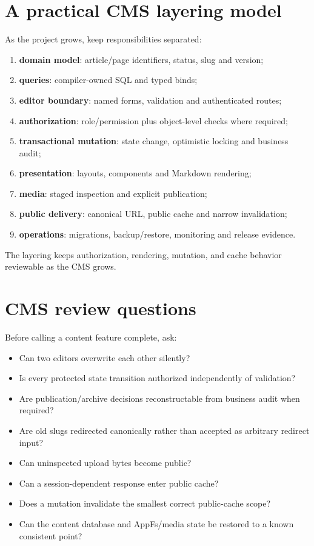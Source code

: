 \section{A practical CMS layering model}

As the project grows, keep responsibilities separated:

\begin{enumerate}
  \item \textbf{domain model}: article/page identifiers, status, slug and version;
  \item \textbf{queries}: compiler-owned SQL and typed binds;
  \item \textbf{editor boundary}: named forms, validation and authenticated routes;
  \item \textbf{authorization}: role/permission plus object-level checks where required;
  \item \textbf{transactional mutation}: state change, optimistic locking and business audit;
  \item \textbf{presentation}: layouts, components and Markdown rendering;
  \item \textbf{media}: staged inspection and explicit publication;
  \item \textbf{public delivery}: canonical URL, public cache and narrow invalidation;
  \item \textbf{operations}: migrations, backup/restore, monitoring and release evidence.
\end{enumerate}

The layering keeps authorization, rendering, mutation, and cache behavior reviewable as the CMS grows.

\section{CMS review questions}

Before calling a content feature complete, ask:

\begin{itemize}
  \item Can two editors overwrite each other silently?
  \item Is every protected state transition authorized independently of validation?
  \item Are publication/archive decisions reconstructable from business audit when required?
  \item Are old slugs redirected canonically rather than accepted as arbitrary redirect input?
  \item Can uninspected upload bytes become public?
  \item Can a session-dependent response enter public cache?
  \item Does a mutation invalidate the smallest correct public-cache scope?
  \item Can the content database and AppFs/media state be restored to a known consistent point?
\end{itemize}

